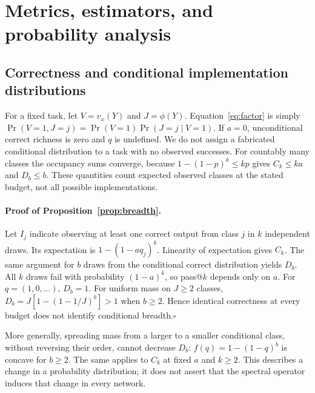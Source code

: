 \documentclass{article}
\begin{document}


\clearpage
\appendix

\section{Metrics, estimators, and probability analysis}
\label{app:metrics}
\subsection{Correctness and conditional implementation distributions}
For a fixed task, let $V=v_x(Y)$ and $J=\phi(Y)$. Equation~\eqref{eq:factor} is simply $\Pr(V=1,J=j)=\Pr(V=1)\Pr(J=j\mid V=1)$. If $a=0$, unconditional correct richness is zero and $q$ is undefined. We do not assign a fabricated conditional distribution to a task with no observed successes. For countably many classes the occupancy sums converge, because $1-(1-p)^k\le kp$ gives $C_k\le ka$ and $D_b\le b$. These quantities count expected observed classes at the stated budget, not all possible implementations.

\paragraph{Proof of Proposition~\ref{prop:breadth}.}
Let $I_j$ indicate observing at least one correct output from class $j$ in $k$ independent draws. Its expectation is $1-(1-aq_j)^k$. Linearity of expectation gives $C_k$. The same argument for $b$ draws from the conditional correct distribution yields $D_b$. All $k$ draws fail with probability $(1-a)^k$, so pass@$k$ depends only on $a$. For $q=(1,0,\ldots)$, $D_b=1$. For uniform mass on $J\ge2$ classes, $D_b=J[1-(1-1/J)^b]>1$ when $b\ge2$. Hence identical correctness at every budget does not identify conditional breadth.\hfill$\square$

More generally, spreading mass from a larger to a smaller conditional class, without reversing their order, cannot decrease $D_b$: $f(q)=1-(1-q)^b$ is concave for $b\ge2$. The same applies to $C_k$ at fixed $a$ and $k\ge2$. This describes a change in a probability distribution; it does not assert that the spectral operator induces that change in every network.
\end{document}
